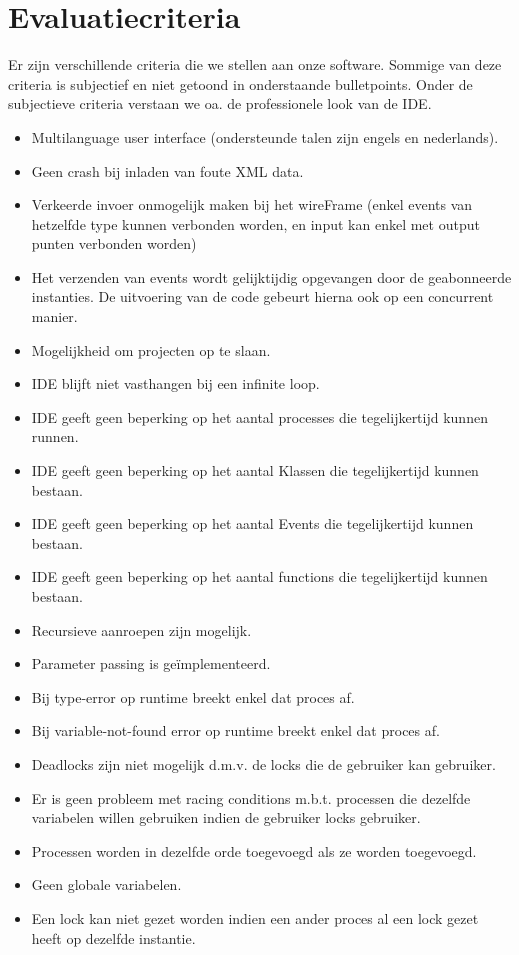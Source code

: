 \documentclass[]{article}
\begin{document}
\section{Evaluatiecriteria}
\label{EvaluatieCriteria}
Er zijn verschillende criteria die we stellen aan onze software. Sommige van deze criteria is subjectief en niet getoond in onderstaande bulletpoints. Onder de subjectieve criteria verstaan we oa. de professionele look van de IDE. 

\begin{itemize}
\item Multilanguage user interface (ondersteunde talen zijn engels en nederlands).
\item Geen crash bij inladen van foute XML data.
\item Verkeerde invoer onmogelijk maken bij het wireFrame (enkel events van hetzelfde type kunnen verbonden worden, en input kan enkel met output punten verbonden worden)
\item Het verzenden van events wordt gelijktijdig opgevangen door de geabonneerde instanties. De uitvoering van de code gebeurt hierna ook op een concurrent manier.
\item Mogelijkheid om projecten op te slaan.
\item IDE blijft niet vasthangen bij een infinite loop.
\item IDE geeft geen beperking op het aantal processes die tegelijkertijd kunnen runnen.
\item IDE geeft geen beperking op het aantal Klassen die tegelijkertijd kunnen bestaan.
\item IDE geeft geen beperking op het aantal Events die tegelijkertijd kunnen bestaan.
\item IDE geeft geen beperking op het aantal functions die tegelijkertijd kunnen bestaan.
\item Recursieve aanroepen zijn mogelijk.
\item Parameter passing is ge\"{i}mplementeerd.
\item Bij type-error op runtime breekt enkel dat proces af.
\item Bij variable-not-found error op runtime breekt enkel dat proces af.
\item Deadlocks zijn niet mogelijk d.m.v. de locks die de gebruiker kan gebruiker.
\item Er is geen probleem met racing conditions m.b.t. processen die dezelfde variabelen willen gebruiken indien de gebruiker locks gebruiker.
\item Processen worden in dezelfde orde toegevoegd als ze worden toegevoegd.
\item Geen globale variabelen.
\item Een lock kan niet gezet worden indien een ander proces al een lock gezet heeft op dezelfde instantie.

\end{itemize}
\end{document}
